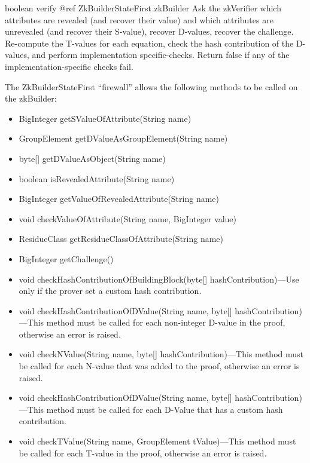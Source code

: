     \begin{method}
    {boolean}
    {verify}
    {
      {@ref ZkBuilderStateFirst zkBuilder}
    }
    Ask the zkVerifier which attributes are revealed (and recover their value) and
    which attributes are unrevealed (and recover their S-value), recover D-values,
    recover the challenge.
    Re-compute the T-values for each equation, check the hash contribution of the D-values,
    and perform implementation specific-checks.
    Return false if any of the implementation-specific checks fail.

    The ZkBuilderStateFirst ``firewall'' allows the following methods to be called on the zkBuilder:
      \begin{itemize}
      \item BigInteger getSValueOfAttribute(String name)
      \item GroupElement getDValueAsGroupElement(String name)
      \item byte[] getDValueAsObject(String name)
      \item boolean isRevealedAttribute(String name)
      \item BigInteger getValueOfRevealedAttribute(String name)
      \item void checkValueOfAttribute(String name, BigInteger value)
      \item ResidueClass getResidueClassOfAttribute(String name)
      \item BigInteger getChallenge()
      \item void checkHashContributionOfBuildingBlock(byte[] hashContribution)---Use only if
        the prover set a custom hash contribution.
      \item void checkHashContributionOfDValue(String name, byte[] hashContribution)---This method must
        be called for each non-integer D-value in the proof, otherwise an error is raised.
      \item void checkNValue(String name, byte[] hashContribution)---This method must be called for
        each N-value that was added to the proof, otherwise an error is raised.
      \item void checkHashContributionOfDValue(String name, byte[] hashContribution)---This method
        must be called for each D-Value that has a custom hash contribution.
      \item void checkTValue(String name, GroupElement tValue)---This method must be called
        for each T-value in the proof, otherwise an error is raised.
      \end{itemize}
    \end{method}


